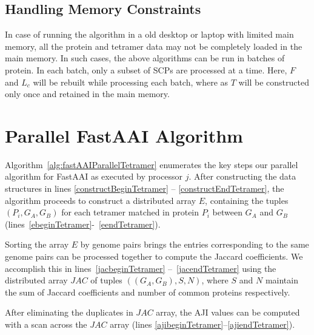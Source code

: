 \documentclass{article}[11pt]
\begin{document}
\subsection{Handling Memory Constraints}
\label{sec:memoryconstraint}
In case of running the algorithm in a old desktop or laptop with limited main memory, all the protein and tetramer data may not be completely loaded in the main memory.
In such cases, the above algorithms can be run in batches of protein.
In each batch, only a subset of SCPs are processed at a time. 
Here, $F$ and $L_c$ will be rebuilt while processing each batch, where as $T$ will be constructed only once and retained in the main memory. 


\section{Parallel FastAAI Algorithm}

Algorithm~\ref{alg:fastAAIParallelTetramer} enumerates the key steps our parallel algorithm for FastAAI as executed by processor $j$. After constructing the data structures in lines \ref{constructBeginTetramer} -- \ref{constructEndTetramer}, the algorithm proceeds to construct a distributed array $E$, containing the tuples $(P_i, G_A, G_B)$ for each tetramer matched in protein $P_i$ between $G_A$ and $G_B$ (lines~\ref{ebeginTetramer}-~\ref{eendTetramer}).

Sorting the array $E$ by genome pairs brings the entries corresponding to the same genome pairs can be processed together to compute the Jaccard coefficients. We accomplish this in lines~\ref{jacbeginTetramer} --~\ref{jacendTetramer} using the distributed array $JAC$ of tuples $((G_A, G_B), S, N)$, where $S$ and $N$ maintain the sum of Jaccard coefficients and number of common proteins respectively.

After eliminating the duplicates in $JAC$ array, the AJI values can be computed with a scan across the $JAC$ array (lines \ref{ajibeginTetramer}--\ref{ajiendTetramer}).
\end{document}
